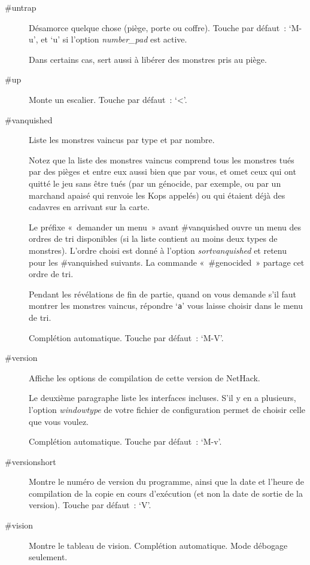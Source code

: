 \documentclass[titlepage]{article}
\begin{document}
\begin{description}
\item[{\#untrap}]
Désamorce quelque chose (piège, porte ou coffre).
Touche par défaut~: `M-u', et `u' si l'option
\textit{number\_pad}
est active.


Dans certains cas, sert aussi à libérer des monstres pris au piège.

\item[{\#up}]
Monte un escalier.
Touche par défaut~: `\textless{}'.

\item[{\#vanquished}]
Liste les monstres vaincus par type et par nombre.


Notez que la liste des monstres vaincus comprend tous les monstres tués
par des pièges et entre eux aussi bien que par vous, et omet ceux qui ont
quitté le jeu sans être tués (par un génocide, par exemple, ou par un
marchand apaisé qui renvoie les Kops appelés) ou qui étaient déjà des
cadavres en arrivant sur la carte.


Le préfixe «~demander un menu~» avant \#vanquished ouvre un menu des
ordres de tri disponibles (si la liste contient au moins deux types de
monstres).
L'ordre choisi est donné à l'option
\textit{sortvanquished}
et retenu pour les \#vanquished suivants.
La commande «~\#genocided~» partage cet ordre de tri.


Pendant les révélations de fin de partie, quand on vous demande s'il faut
montrer les monstres vaincus, répondre `\texttt{a}' vous laisse choisir
dans le menu de tri.


Complétion automatique.
Touche par défaut~: `M-V'.

\item[{\#version}]
Affiche les options de compilation de cette version de NetHack.


Le deuxième paragraphe liste les interfaces incluses.
S'il y en a plusieurs, l'option
\textit{windowtype}
de votre fichier de configuration permet de choisir celle que vous
voulez.


Complétion automatique.
Touche par défaut~: `M-v'.

\item[{\#versionshort}]
Montre le numéro de version du programme, ainsi que la date et l'heure de
compilation de la copie en cours d'exécution (et non la date de sortie de
la version).
Touche par défaut~: `V'.

\item[{\#vision}]
Montre le tableau de vision.
Complétion automatique.
Mode débogage seulement.


\end{description}
\end{document}
